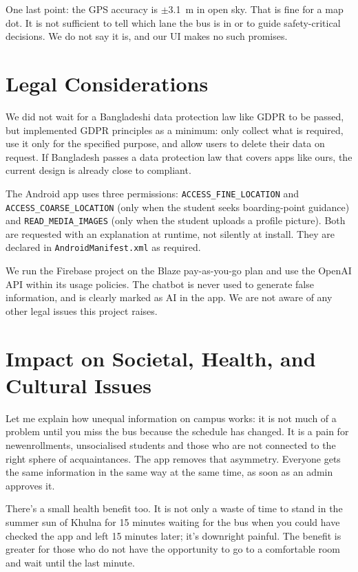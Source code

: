 \documentclass[12pt,a4paper]{report}
\begin{document}
One last point: the GPS accuracy is $\pm$3.1~m in open sky. That is fine for a map dot. It is not sufficient to tell which lane the bus is in or to guide safety-critical decisions. We do not say it is, and our UI makes no such promises.

\section{Legal Considerations}

We did not wait for a Bangladeshi data protection law like GDPR to be passed, but implemented GDPR principles as a minimum: only collect what is required, use it only for the specified purpose, and allow users to delete their data on request. If Bangladesh passes a data protection law that covers apps like ours, the current design is already close to compliant.

The Android app uses three permissions: \texttt{ACCESS\_FINE\_LOCATION} and \texttt{ACCESS\_COARSE\_LOCATION} (only when the student seeks boarding-point guidance) and \texttt{READ\_MEDIA\_IMAGES} (only when the student uploads a profile picture). Both are requested with an explanation at runtime, not silently at install. They are declared in \texttt{AndroidManifest.xml} as required.

We run the Firebase project on the Blaze pay-as-you-go plan and use the OpenAI API within its usage policies. The chatbot is never used to generate false information, and is clearly marked as AI in the app. We are not aware of any other legal issues this project raises.

\section{Impact on Societal, Health, and Cultural Issues}

Let me explain how unequal information on campus works: it is not much of a problem until you miss the bus because the schedule has changed. It is a pain for newenrollments, unsocialised students and those who are not connected to the right sphere of acquaintances. The app removes that asymmetry. Everyone gets the same information in the same way at the same time, as soon as an admin approves it.

There's a small health benefit too. It is not only a waste of time to stand in the summer sun of Khulna for 15 minutes waiting for the bus when you could have checked the app and left 15 minutes later; it's downright painful. The benefit is greater for those who do not have the opportunity to go to a comfortable room and wait until the last minute.
\end{document}
